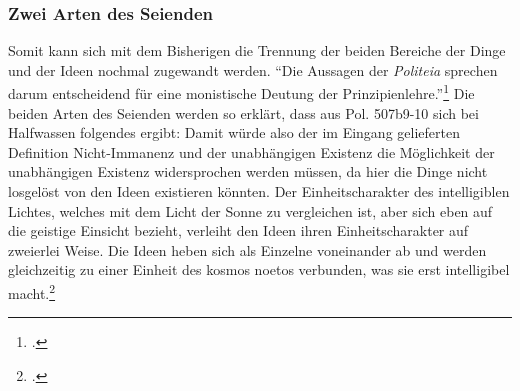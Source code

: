 \subsubsection{Zwei Arten des Seienden}
Somit kann sich mit dem Bisherigen die Trennung der beiden Bereiche der Dinge und der Ideen nochmal zugewandt werden.
\enquote{Die Aussagen der \emph{Politeia} sprechen darum entscheidend für eine monistische Deutung der Prinzipienlehre.}\footcite[][S. 137]{halfwassen2015spuren}
Die beiden Arten des Seienden werden so erklärt, dass  
aus Pol. 507b9-10 sich bei Halfwassen folgendes ergibt:
Damit würde also der im Eingang gelieferten Definition Nicht-Immanenz und der unabhängigen Existenz die Möglichkeit der unabhängigen Existenz widersprochen werden müssen, da hier die Dinge nicht losgelöst von den Ideen existieren könnten.
Der Einheitscharakter des intelligiblen Lichtes, welches mit dem Licht der Sonne zu vergleichen ist, aber sich eben auf die geistige Einsicht bezieht, verleiht den Ideen ihren Einheitscharakter auf zweierlei Weise. Die Ideen heben sich als Einzelne voneinander ab und werden gleichzeitig zu einer Einheit des kosmos noetos verbunden, was sie erst intelligibel macht.\footcite[vgl.][S. 252]{halfwassenaufstieg2006} 
